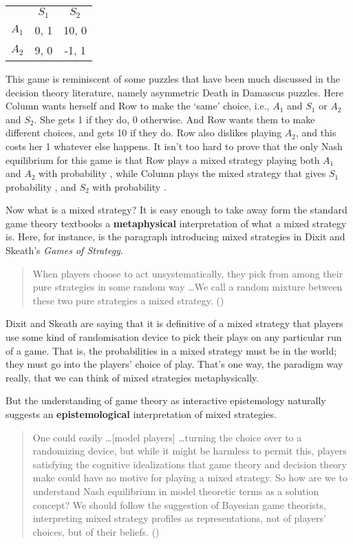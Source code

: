 \documentclass[
  10pt,
  letterpaper,
  DIV=11,
  numbers=noendperiod,
  twoside]{scrartcl}
\begin{document}
\newpage

\begin{longtable}[]{@{}lcc@{}}
\toprule\noalign{}
\endhead
\bottomrule\noalign{}
\endlastfoot
& \(S_1\) & \(S_2\) \\
\(A_1\) & 0, 1 & 10, 0 \\
\(A_2\) & 9, 0 & -1, 1 \\
\end{longtable}

This game is reminiscent of some puzzles that have been much discussed
in the decision theory literature, namely asymmetric Death in Damascus
puzzles. Here Column wants herself and Row to make the `same' choice,
i.e., \(A_1\) and \(S_1\) or \(A_2\) and \(S_2\). She gets 1 if they do,
0 otherwise. And Row wants them to make different choices, and gets 10
if they do. Row also dislikes playing \(A_2\), and this costs her 1
whatever else happens. It isn't too hard to prove that the only Nash
equilibrium for this game is that Row plays a mixed strategy playing
both \(A_1\) and \(A_2\) with probability , while Column plays the mixed
strategy that gives \(S_1\) probability , and \(S_2\) with probability .

Now what is a mixed strategy? It is easy enough to take away form the
standard game theory textbooks a \textbf{metaphysical} interpretation of
what a mixed strategy is. Here, for instance, is the paragraph
introducing mixed strategies in Dixit and Skeath's \emph{Games of
Strategy}.

\begin{quote}
When players choose to act unsystematically, they pick from among their
pure strategies in some random way \ldots We call a random mixture
between these two pure strategies a mixed strategy.
()
\end{quote}

Dixit and Skeath are saying that it is definitive of a mixed strategy
that players use some kind of randomisation device to pick their plays
on any particular run of a game. That is, the probabilities in a mixed
strategy must be in the world; they must go into the players' choice of
play. That's one way, the paradigm way really, that we can think of
mixed strategies metaphysically.

But the understanding of game theory as interactive epistemology
naturally suggests an \textbf{epistemological} interpretation of mixed
strategies.

\begin{quote}
One could easily \ldots{[}model players{]} \ldots turning the choice
over to a randomizing device, but while it might be harmless to permit
this, players satisfying the cognitive idealizations that game theory
and decision theory make could have no motive for playing a mixed
strategy. So how are we to understand Nash equilibrium in model
theoretic terms as a solution concept? We should follow the suggestion
of Bayesian game theorists, interpreting mixed strategy profiles as
representations, not of players' choices, but of their beliefs.
()
\end{quote}
\end{document}
